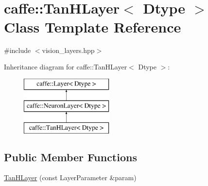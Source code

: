 \hypertarget{classcaffe_1_1_tan_h_layer}{\section{caffe\+:\+:Tan\+H\+Layer$<$ Dtype $>$ Class Template Reference}
\label{classcaffe_1_1_tan_h_layer}
}


{\ttfamily \#include $<$vision\+\_\+layers.\+hpp$>$}

Inheritance diagram for caffe\+:\+:Tan\+H\+Layer$<$ Dtype $>$\+:\begin{figure}[H]
\begin{center}
\leavevmode
\includegraphics[height=3.000000cm]{classcaffe_1_1_tan_h_layer}
\end{center}
\end{figure}
\subsection*{Public Member Functions}
\begin{DoxyCompactItemize}
\item 
\hyperlink{classcaffe_1_1_tan_h_layer_a71e5977bc3aa2d0fa7a05a956178f25b}{Tan\+H\+Layer} (const Layer\+Parameter \&param)
\end{DoxyCompactItemize}
